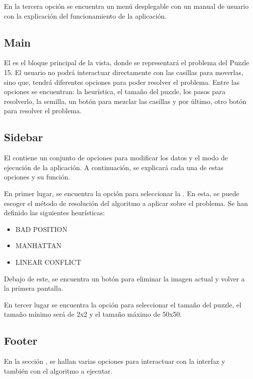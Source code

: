 En la tercera opción se encuentra un menú desplegable con un manual de usuario con la explicación del funcionamiento de la aplicación.
 
\subsection{Main}

El  es el bloque principal de la vista, donde se representará el problema del Puzzle 15. El usuario no podrá interactuar directamente con las casillas para moverlas, sino que, tendrá diferentes opciones para poder resolver el problema. Entre las opciones se encuentran: la heurística, el tamaño del puzzle, los pasos para resolverlo, la semilla, un botón para mezclar las casillas y por último, otro botón para resolver el problema.

\subsection{Sidebar}\label{Sidebar}

El  contiene un conjunto de opciones para modificar los datos y el modo de ejecución de la aplicación. A continuación, se explicará cada una de estas opciones y su función.\bigskip

En primer lugar, se encuentra la opción para seleccionar la . En esta, se puede escoger el método de resolución del algoritmo a aplicar sobre el problema. Se han definido las siguientes heurísticas:

\begin{itemize}
    \item BAD POSITION
    \item MANHATTAN
    \item LINEAR CONFLICT
\end{itemize}
\bigskip

Debajo de este, se encuentra un botón para eliminar la imagen actual y volver a la primera pantalla. \bigskip

En tercer lugar se encuentra la opción para seleccionar el tamaño del puzzle, el tamaño mínimo será de 2x2 y el tamaño máximo de 50x50.

\subsection{Footer}\label{Footer}

En la sección , se hallan varias opciones para interactuar con la interfaz y también con el algoritmo a ejecutar. \bigskip


